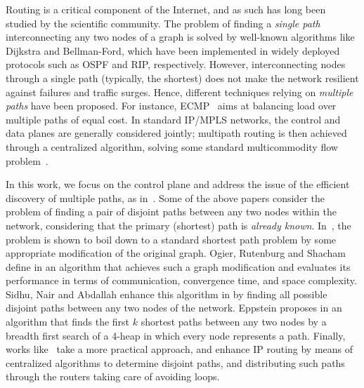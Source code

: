 \documentclass[conference]{IEEEtran}
\begin{document}
Routing is a critical component of the Internet, and as such has long been studied by the scientific community. The problem of finding a \emph{single path} interconnecting any two nodes of a graph is solved by well-known  algorithms like Dijkstra and Bellman-Ford, which have been implemented in widely deployed protocols such as OSPF and RIP, respectively. However, interconnecting nodes through a   single path (typically, the shortest) does not make the network resilient against  failures and traffic surges. Hence, different techniques relying on \emph{multiple paths} have been proposed. For instance, ECMP~\cite{HoppsRfc2992} aims at balancing load  over multiple paths of equal cost.   In standard IP/MPLS networks,  the control and data planes are generally considered jointly; multipath routing  is then achieved through a centralized algorithm, solving some  standard  multicommodity flow problem~\cite{Guerin97Globecom,Srihari01Iwqos}. 


In this work, we focus on the control plane and address the issue of the efficient discovery of  multiple paths, as in~\cite{Ogier93IEETrans,Eppstein94Fcs, Sidhu91Sigcomm,Merindol09Infocom,Johnson07Rfc4728,Blesa04Evo,Chen02ANW,Chen98Infocom}. Some of the above papers consider the problem of finding a pair of disjoint paths between any two nodes within the network, considering that the primary (shortest) path is \emph{already known}. In~\cite{Ogier93IEETrans,Eppstein94Fcs, Sidhu91Sigcomm}, the problem is shown to boil down  to a standard shortest path problem by some appropriate modification of the original graph.
Ogier, Rutenburg and Shacham define  in \cite{Ogier93IEETrans} an algorithm that achieves such a graph modification and   evaluates its performance in terms of communication, convergence time, and space complexity. 
Sidhu, Nair and Abdallah enhance this algorithm in  \cite{Sidhu91Sigcomm}  by finding all possible disjoint paths between any two nodes of the network. 
Eppstein proposes in \cite{Eppstein94Fcs} an algorithm that finds the first $k$ shortest paths between any two nodes by a breadth first search of a 4-heap in which every node represents a path. Finally, works like~\cite{Merindol09Infocom} take a more practical approach, and enhance IP routing by means of centralized algorithms to determine disjoint paths, and distributing such paths through the routers taking care of avoiding loops. 
\end{document}
